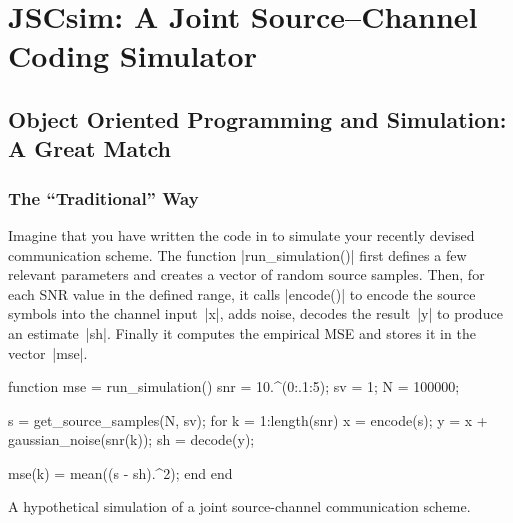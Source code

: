 \chapter{JSCsim: A Joint Source--Channel Coding Simulator}
\label{ch:simulator}

\DefineShortVerb{\|}


\section[Object Oriented Programming for Simulations]{Object Oriented
Programming and Simulation: A Great Match}\label{sec:ooforsim}

\subsection{The ``Traditional'' Way}

Imagine that you have written the code in  to simulate
your recently devised communication scheme. The function |run_simulation()|
first defines a few relevant parameters and creates a vector of random source
samples. Then, for each SNR value in the defined range, it calls |encode()| to
encode the source symbols into the channel input~|x|, adds noise, decodes the
result~|y|  to produce an estimate~|sh|.  Finally it computes the empirical MSE
and stores it in the vector~|mse|.

\begin{listing}
\begin{Code}
  function mse = run_simulation()
    snr = 10.^(0:.1:5);   %
    sv  = 1;              %
    N   = 100000;         %
    
    s = get_source_samples(N, sv);
    for k = 1:length(snr)
      x  = encode(s);
      y  = x + gaussian_noise(snr(k));
      sh = decode(y);
      
      mse(k) = mean((s - sh).^2);
    end
  end
\end{Code}
\caption{A hypothetical simulation of a joint source-channel communication
scheme.}
\label{lst:proceduralsim}
\end{listing}

